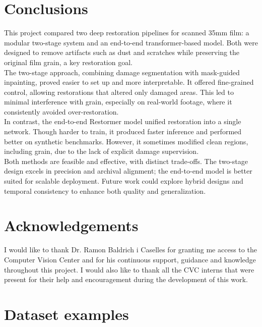 \documentclass[10pt,a4paper,twocolumn,twoside]{article}
\begin{document}
\section{Conclusions}
This project compared two deep restoration pipelines for scanned 35mm film: a modular two-stage system and an end-to-end transformer-based model. Both were designed to remove artifacts such as dust and scratches while preserving the original film grain, a key restoration goal. \\
The two-stage approach, combining damage segmentation with mask-guided inpainting, proved easier to set up and more interpretable. It offered fine-grained control, allowing restorations that altered only damaged areas. This led to minimal interference with grain, especially on real-world footage, where it consistently avoided over-restoration. \\
In contrast, the end-to-end Restormer model unified restoration into a single network. Though harder to train, it produced faster inference and performed better on synthetic benchmarks. However, it sometimes modified clean regions, including grain, due to the lack of explicit damage supervision. \\
Both methods are feasible and effective, with distinct trade-offs. The two-stage design excels in precision and archival alignment; the end-to-end model is better suited for scalable deployment. Future work could explore hybrid designs and temporal consistency to enhance both quality and generalization.

\section{Acknowledgements}
I would like to thank Dr. Ramon Baldrich i Caselles for granting me access to the Computer Vision Center and for his continuous support, guidance and knowledge throughout this project. I would also like to thank all the CVC interns that were present for their help and encouragement during the development of this work.
\begingroup
\small  %
\renewcommand{\refname}{References}


\endgroup
\onecolumn
\appendix
\section{Dataset examples}
\end{document}
